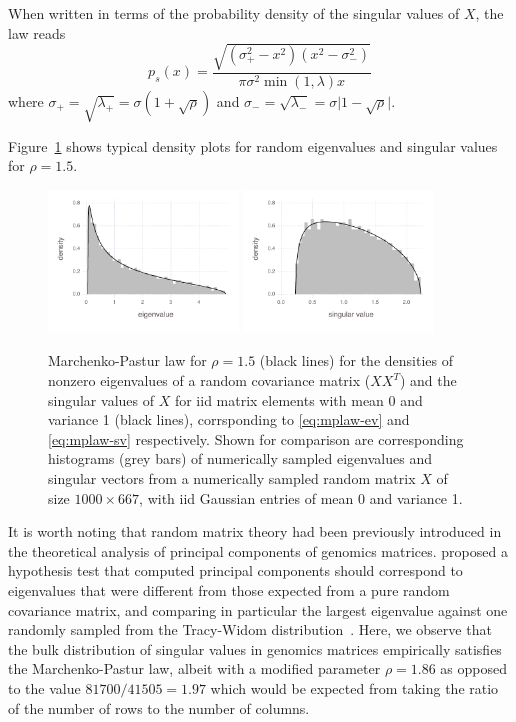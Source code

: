 \documentclass[review]{siamart0516}
\begin{document}
When written in terms of the probability density of the singular values of $X$,
the law reads
%
\begin{equation}
    \label{eq:mplaw-sv}
    p_s(x) = \frac {\sqrt{(\sigma_+^2-x^2)(x^2-\sigma_-^2)}} {\pi \sigma^2 \min(1, \lambda) x}
\end{equation}
%
where
$\sigma_+ = \sqrt{\lambda_+} = \sigma(1+\sqrt{\rho})$ and
$\sigma_- = \sqrt{\lambda_-} = \sigma\vert1-\sqrt{\rho}\vert$.

Figure~\ref{fig:mplaw} shows typical density plots for random eigenvalues
and singular values for $\rho=1.5$.

\begin{figure}
\caption{Marchenko-Pastur law for $\rho=1.5$ (black lines) for the densities of
nonzero eigenvalues of a random covariance matrix ($XX^{T}$) and the singular
values of $X$ for iid matrix elements with mean 0 and variance 1
(black lines), corrsponding to \eqref{eq:mplaw-ev} and \eqref{eq:mplaw-sv}
respectively.
Shown for comparison are corresponding histograms (grey
bars) of numerically sampled eigenvalues and singular vectors from
a numerically sampled random matrix $X$ of size $1000\times667$,
with iid Gaussian entries of mean 0 and variance 1.
\label{fig:mplaw}
}

\includegraphics[width=0.45\textwidth]{fig/mplaw/fig-mplaw-ev}
%
\includegraphics[width=0.45\textwidth]{fig/mplaw/fig-mplaw-sv}
\end{figure}


It is worth noting that random matrix theory had been previously introduced in
the theoretical analysis of principal components of genomics matrices.
\cite{Patterson2006} proposed a hypothesis test that computed principal components
should correspond to eigenvalues that were different from those expected from a
pure random covariance matrix,
and comparing in particular the largest eigenvalue against one randomly sampled
from the Tracy-Widom distribution~\cite{Tracy1993,Tracy1994}.
Here, we observe that the bulk distribution of singular values in genomics
matrices empirically satisfies the Marchenko-Pastur law, albeit with a
modified parameter $\rho = 1.86$ as opposed to the value $81700/41505=1.97$
which would be expected from taking the ratio of the number of rows to the
number of columns.
\end{document}
